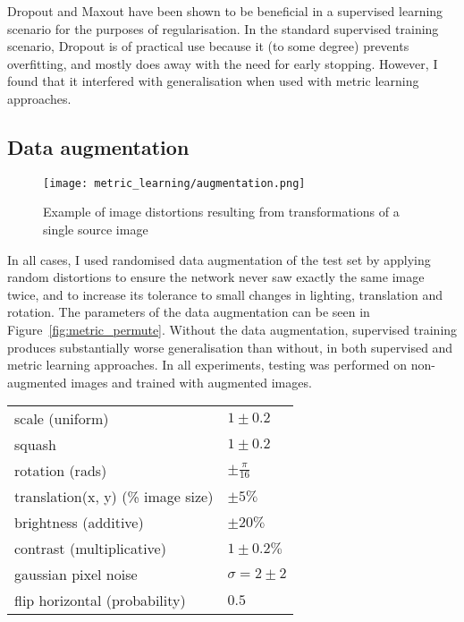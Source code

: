Dropout and Maxout have been shown to be beneficial in a supervised learning scenario for the purposes of regularisation. In the standard supervised training scenario, Dropout is of practical use because it (to some degree) prevents overfitting, and mostly does away with the need for early stopping. However, I found that it interfered with generalisation when used with metric learning approaches.

\subsection {Data augmentation}

\begin{figure}[h]
\centering
\texttt{[image: metric\_learning/augmentation.png]}
\caption{Example of image distortions resulting from transformations of a single source image}
\label{fig:metric_augmentation}
\end{figure}


In all cases, I used randomised data augmentation of the test set by applying random distortions to ensure the network never saw exactly the same image twice, and to increase its tolerance to small changes in lighting, translation and rotation. The parameters of the data augmentation can be seen in Figure~\ref{fig:metric_permute}. Without the data augmentation, supervised training produces substantially worse generalisation than without, in both supervised and metric learning approaches. In all experiments, testing was performed on non-augmented images and trained with augmented images.

\begin{table*}
  \centering
    \caption{Ranges of parameters used for image augmentation }

  \begin{tabular}{ l  l }
    \toprule
    scale (uniform) & $ 1 \pm 0.2 $  \\ 
    squash  & $ 1 \pm 0.2 $  \\ 
    rotation (rads) & $ \pm \frac{\pi}{16} $ \\ 
    translation(x, y) (\% image size) & $ \pm 5 \% $ \\ 
    brightness (additive) & $ \pm 20 \% $ \\ 
    contrast (multiplicative) & $ 1 \pm 0.2 \% $ \\ 
    gaussian pixel noise & $ \sigma = 2 \pm 2 $  \\ 
    flip horizontal (probability) & $ 0.5 $ \\ 
    \bottomrule
  \end{tabular}
\label{fig:metric_permute}
\end{table*}


